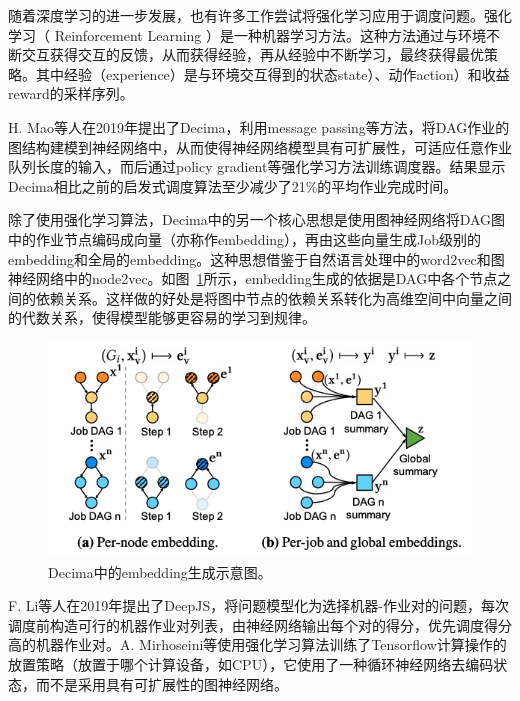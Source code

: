 随着深度学习的进一步发展，也有许多工作尝试将强化学习应用于调度问题。强化学习（ Reinforcement Learning ）是一种机器学习方法。这种方法通过与环境不断交互获得交互的反馈，从而获得经验，再从经验中不断学习，最终获得最优策略。其中经验（experience）是与环境交互得到的状态state）、动作action）和收益reward的采样序列。

H. Mao等人在2019年提出了Decima，利用message passing等方法，将DAG作业的图结构建模到神经网络中，从而使得神经网络模型具有可扩展性，可适应任意作业队列长度的输入，而后通过policy gradient等强化学习方法训练调度器。结果显示Decima相比之前的启发式调度算法至少减少了21\%的平均作业完成时间。

除了使用强化学习算法，Decima中的另一个核心思想是使用图神经网络将DAG图中的作业节点编码成向量（亦称作embedding），再由这些向量生成Job级别的embedding和全局的embedding。这种思想借鉴于自然语言处理中的word2vec和图神经网络中的node2vec。如图~\ref{decima_embedding}所示，embedding生成的依据是DAG中各个节点之间的依赖关系。这样做的好处是将图中节点的依赖关系转化为高维空间中向量之间的代数关系，使得模型能够更容易的学习到规律。

\begin{figure}[h]
    \centerline{\includegraphics[width=\textwidth]{figures/decima-embedding.png}}
    \caption{Decima中的embedding生成示意图。}
    \label{decima_embedding}
\end{figure}

F. Li等人在2019年提出了DeepJS\parencite{li2019deepjs}，将问题模型化为选择机器-作业对的问题，每次调度前构造可行的机器作业对列表，由神经网络输出每个对的得分，优先调度得分高的机器作业对。A. Mirhoseini等\parencite{mirhoseini2017device}使用强化学习算法训练了Tensorflow计算操作的放置策略（放置于哪个计算设备，如CPU），它使用了一种循环神经网络去编码状态，而不是采用具有可扩展性的图神经网络。

